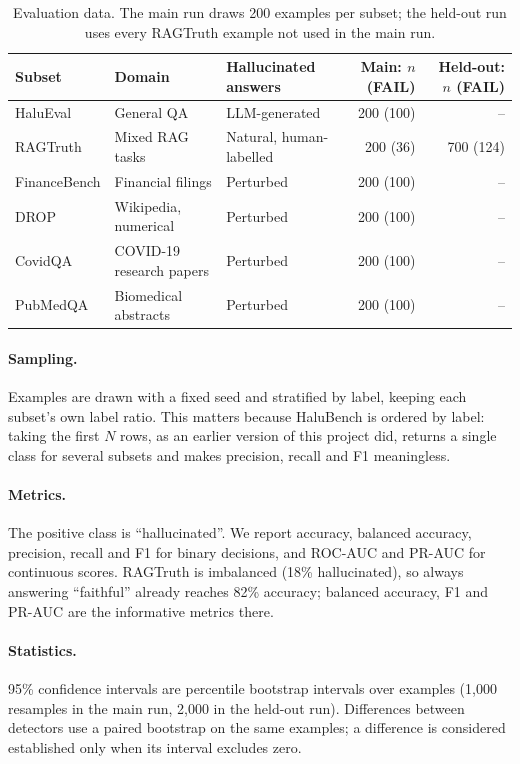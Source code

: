 \documentclass[11pt,a4paper]{article}
\begin{document}
\begin{table}[t]
\centering\small
\caption{Evaluation data. The main run draws 200 examples per subset; the held-out run
uses every RAGTruth example not used in the main run.}
\label{tab:data}
\setlength{\tabcolsep}{4pt}
\begin{tabular}{@{}l l l r r@{}}
\toprule
Subset & Domain & Hallucinated answers & Main: $n$ (FAIL) & Held-out: $n$ (FAIL) \\
\midrule
HaluEval     & General QA                 & LLM-generated         & 200 (100) & -- \\
RAGTruth     & Mixed RAG tasks            & Natural, human-labelled & 200 (36) & 700 (124) \\
FinanceBench & Financial filings          & Perturbed             & 200 (100) & -- \\
DROP         & Wikipedia, numerical       & Perturbed             & 200 (100) & -- \\
CovidQA      & COVID-19 research papers   & Perturbed             & 200 (100) & -- \\
PubMedQA     & Biomedical abstracts       & Perturbed             & 200 (100) & -- \\
\bottomrule
\end{tabular}
\end{table}

\paragraph{Sampling.}
Examples are drawn with a fixed seed and stratified by label, keeping each subset's own
label ratio. This matters because HaluBench is ordered by label: taking the first $N$
rows, as an earlier version of this project did, returns a single class for several
subsets and makes precision, recall and F1 meaningless.

\paragraph{Metrics.}
The positive class is ``hallucinated''. We report accuracy, balanced accuracy,
precision, recall and F1 for binary decisions, and ROC-AUC and PR-AUC for continuous
scores. RAGTruth is imbalanced (18\% hallucinated), so always answering ``faithful''
already reaches 82\% accuracy; balanced accuracy, F1 and PR-AUC are the informative
metrics there.

\paragraph{Statistics.}
95\% confidence intervals are percentile bootstrap intervals over examples (1{,}000
resamples in the main run, 2{,}000 in the held-out run). Differences between detectors
use a paired bootstrap on the same examples; a difference is considered established only
when its interval excludes zero.
\end{document}
